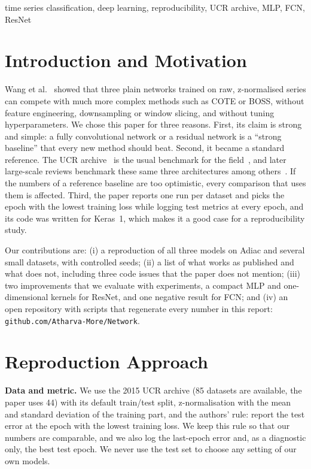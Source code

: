 \documentclass[conference]{IEEEtran}
\begin{document}
\begin{IEEEkeywords}
time series classification, deep learning, reproducibility, UCR archive, MLP, FCN, ResNet
\end{IEEEkeywords}

\section{Introduction and Motivation}
Wang et al.~\cite{wang2016} showed that three plain networks trained on raw, z-normalised series can compete with much more complex methods such as COTE or BOSS, without feature engineering, downsampling or window slicing, and without tuning hyperparameters. We chose this paper for three reasons. First, its claim is strong and simple: a fully convolutional network or a residual network is a ``strong baseline'' that every new method should beat. Second, it became a standard reference. The UCR archive~\cite{ucr2015} is the usual benchmark for the field~\cite{bagnall2017}, and later large-scale reviews benchmark these same three architectures among others~\cite{fawaz2019}. If the numbers of a reference baseline are too optimistic, every comparison that uses them is affected. Third, the paper reports one run per dataset and picks the epoch with the lowest training loss while logging test metrics at every epoch, and its code was written for Keras~1, which makes it a good case for a reproducibility study.

Our contributions are: (i) a reproduction of all three models on Adiac and several small datasets, with controlled seeds; (ii) a list of what works as published and what does not, including three code issues that the paper does not mention; (iii) two improvements that we evaluate with experiments, a compact MLP and one-dimensional kernels for ResNet, and one negative result for FCN; and (iv) an open repository with scripts that regenerate every number in this report: \texttt{github.com/Atharva-More/Network}.

\section{Reproduction Approach}
\textbf{Data and metric.} We use the 2015 UCR archive (85 datasets are available, the paper uses 44) with its default train/test split, z-normalisation with the mean and standard deviation of the training part, and the authors' rule: report the test error at the epoch with the lowest training loss. We keep this rule so that our numbers are comparable, and we also log the last-epoch error and, as a diagnostic only, the best test epoch. We never use the test set to choose any setting of our own models.
\end{document}
